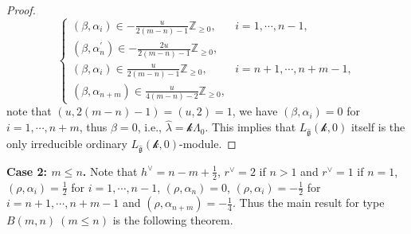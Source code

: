 \documentclass[12pt]{article}
\begin{document}
\begin{proof}
$$\begin{cases}
(\beta,\alpha_i)\in -\frac{u}{2(m-n)-1}\mathbb{Z}_{\geq0},&i=1,\cdots,n-1,\\
(\beta,\alpha_n^\prime)\in -\frac{2u}{2(m-n)-1}\mathbb{Z}_{\geq0},\\
(\beta,\alpha_i)\in \frac{u}{2(m-n)-1}\mathbb{Z}_{\geq0},&i=n+1,\cdots,n+m-1,\\
(\beta,\alpha_{n+m})\in \frac{u}{4(m-n)-2}\mathbb{Z}_{\geq0},
\end{cases}$$
note that $(u,2(m-n)-1)=(u,2)=1$, we have $(\beta,\alpha_i)=0$ for $i=1,\cdots,n+m$, thus $\beta=0$, i.e., $\hat{\lambda}=\mathcal{k}\Lambda_0$.
This implies that $L_{\widehat{\mathfrak{g}}}(\mathcal{k},0)$ itself is the only irreducible ordinary $L_{\widehat{\mathfrak{g}}}(\mathcal{k},0)$-module.
\end{proof}

{\bf Case 2: $m\leq n$.} %
Note that $h^{\vee}=n-m+\frac{1}{2}$, $r^\vee=2$ if $n>1$ and $r^\vee=1$ if $n=1$,
$(\rho, \alpha_i)=\frac{1}{2}$ for $i=1,\cdots,n-1$, $(\rho, \alpha_n)=0$,
$(\rho, \alpha_i)=-\frac{1}{2}$ for $i=n+1,\cdots,n+m-1$ and $(\rho, \alpha_{n+m})=-\frac{1}{4}$.
Thus the main result for type $B(m,n)~(m\leq n)$ is the following theorem.
\end{document}
